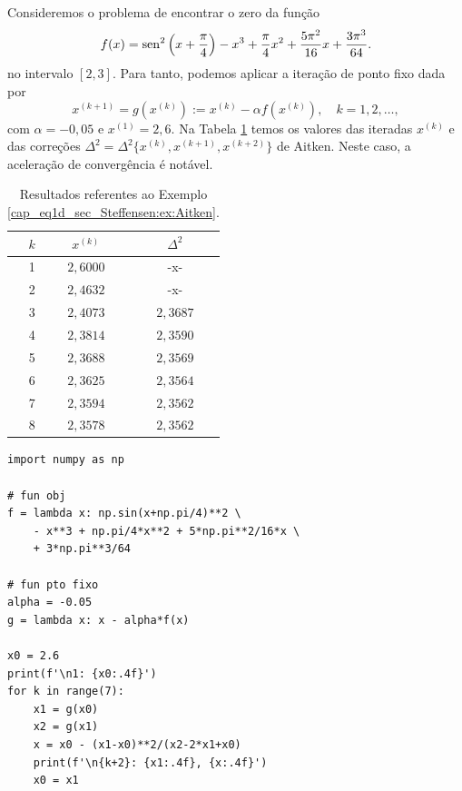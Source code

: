 \begin{ex}\label{cap_eq1d_sec_Steffensen:ex:Aitken}
  Consideremos o problema de encontrar o zero da função
  \begin{equation}
    f(x) = \operatorname{sen}^2\left(x+\frac{\pi}{4}\right) - x^3 + \frac{\pi}{4}x^2 + \frac{5\pi^2}{16}x + \frac{3\pi^3}{64}.
  \end{equation}
  no intervalo $[2,3]$. Para tanto, podemos aplicar a iteração de ponto fixo dada por
  \begin{equation}
    x^{(k+1)} = g(x^{(k)}) := x^{(k)} - \alpha f(x^{(k)}),\quad k=1,2,\ldots,
  \end{equation}
com $\alpha=-0,05$ e $x^{(1)}=2,6$. Na Tabela \ref{cap_eq1d_sec_Steffensen:tab:ex_Aitken} temos os valores das iteradas $x^{(k)}$ e das correções $\Delta^2 = \Delta^2\{x^{(k)},x^{(k+1)},x^{(k+2)}\}$ de Aitken. Neste caso, a aceleração de convergência é notável.

\begin{table}[H]
  \centering
  \caption{Resultados referentes ao Exemplo \ref{cap_eq1d_sec_Steffensen:ex:Aitken}.}
  \label{cap_eq1d_sec_Steffensen:tab:ex_Aitken}
  \begin{tabular}{r|cc}
    $k$ & $x^{(k)}$ & $\Delta^2$ \\\hline
    1 & $2,6000$ & -x- \\
    2 & $2,4632$ & -x- \\
    3 & $2,4073$ & $2,3687$ \\
    4 & $2,3814$ & $2,3590$ \\
    5 & $2,3688$ & $2,3569$ \\
    6 & $2,3625$ & $2,3564$ \\
    7 & $2,3594$ & $2,3562$ \\
    8 & $2,3578$ & $2,3562$ \\\hline
  \end{tabular}
\end{table}

\begin{lstlisting}
import numpy as np

# fun obj
f = lambda x: np.sin(x+np.pi/4)**2 \
    - x**3 + np.pi/4*x**2 + 5*np.pi**2/16*x \
    + 3*np.pi**3/64

# fun pto fixo
alpha = -0.05
g = lambda x: x - alpha*f(x)

x0 = 2.6
print(f'\n1: {x0:.4f}')
for k in range(7):
    x1 = g(x0)
    x2 = g(x1)
    x = x0 - (x1-x0)**2/(x2-2*x1+x0)
    print(f'\n{k+2}: {x1:.4f}, {x:.4f}')
    x0 = x1
\end{lstlisting}
\end{ex}

